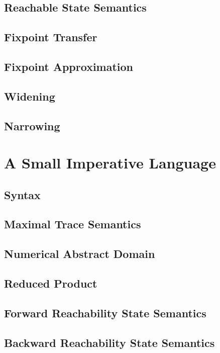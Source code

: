 \subsection{Reachable State Semantics}

\subsection{Fixpoint Transfer}

\subsection{Fixpoint Approximation}

\subsection{Widening}

\subsection{Narrowing}


\section{A Small Imperative Language}

\subsection{Syntax}

\subsection{Maximal Trace Semantics}

\subsection{Numerical Abstract Domain}

\subsection{Reduced Product}

\subsection{Forward Reachability State Semantics}

\subsection{Backward Reachability State Semantics}
